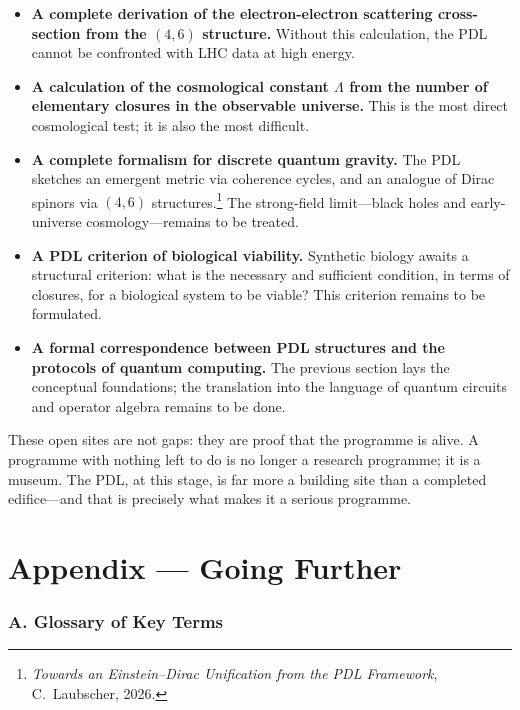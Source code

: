 \documentclass[12pt, a4paper, openright]{book}
\begin{document}
\begin{itemize}
\item \textbf{A complete derivation of the electron-electron scattering cross-section from the $(4,6)$ structure.} Without this calculation, the PDL cannot be confronted with LHC data at high energy.
\item \textbf{A calculation of the cosmological constant $\Lambda$ from the number of elementary closures in the observable universe.} This is the most direct cosmological test; it is also the most difficult.
\item \textbf{A complete formalism for discrete quantum gravity.} The PDL sketches an emergent metric via coherence cycles, and an analogue of Dirac spinors via $(4,6)$ structures.\footnote{\textit{Towards an Einstein--Dirac Unification from the PDL Framework}, C.~Laubscher, 2026.} The strong-field limit---black holes and early-universe cosmology---remains to be treated.
\item \textbf{A PDL criterion of biological viability.} Synthetic biology awaits a structural criterion: what is the necessary and sufficient condition, in terms of closures, for a biological system to be viable? This criterion remains to be formulated.
\item \textbf{A formal correspondence between PDL structures and the protocols of quantum computing.} The previous section lays the conceptual foundations; the translation into the language of quantum circuits and operator algebra remains to be done.
\end{itemize}

These open sites are not gaps: they are proof that the programme is alive. A programme with nothing left to do is no longer a research programme; it is a museum. The PDL, at this stage, is far more a building site than a completed edifice---and that is precisely what makes it a serious programme.

\backmatter
\appendix

\chapter*{Appendix --- Going Further}

\subsection*{A. Glossary of Key Terms}
\end{document}
